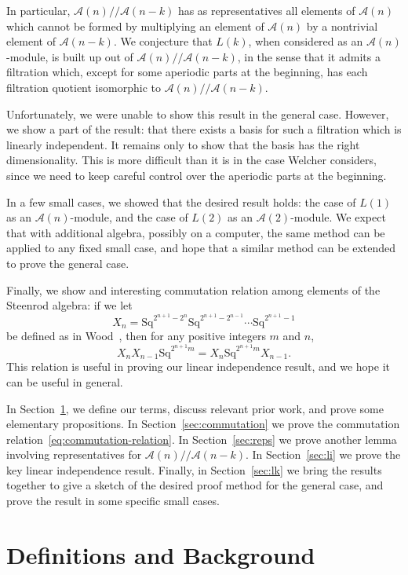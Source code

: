 \documentclass{article}
\newcommand{\A}{\mathcal{A}}
\newcommand{\Sq}{\mathrm{Sq}}
\newcommand{\mmod}{/\!/\!}
\begin{document}
In particular, $\A(n)\mmod\A(n-k)$ has as representatives all elements of $\A(n)$ which cannot be formed by multiplying an element of $\A(n)$ by a nontrivial element of $\A(n-k)$.  We conjecture that $L(k)$, when considered as an $\A(n)$-module, is built up out of $\A(n)\mmod\A(n-k)$, in the sense that it admits a filtration which, except for some aperiodic parts at the beginning, has each filtration quotient isomorphic to $\A(n)\mmod\A(n-k)$.

Unfortunately, we were unable to show this result in the general case.  However, we show a part of the result: that there exists a basis for such a filtration which is linearly independent.  It remains only to show that the basis has the right dimensionality.  This is more difficult than it is in the case Welcher considers, since we need to keep careful control over the aperiodic parts at the beginning.

In a few small cases, we showed that the desired result holds: the case of $L(1)$ as an $\A(n)$-module, and the case of $L(2)$ as an $\A(2)$-module.  We expect that with additional algebra, possibly on a computer, the same method can be applied to any fixed small case, and hope that a similar method can be extended to prove the general case.

Finally, we show and interesting commutation relation among elements of the Steenrod algebra: if we let
\[ X_n = \Sq^{2^{n+1}-2^n}\Sq^{2^{n+1}-2^{n-1}}\cdots\Sq^{2^{n+1}-1} \]
be defined as in Wood~\cite{wood}, then for any positive integers $m$ and $n$, 
\begin{equation}X_nX_{n-1}\Sq^{2^{n+1}m} = X_n\Sq^{2^{n+1}m}X_{n-1}.\label{eq:commutation-relation}\end{equation}
This relation is useful in proving our linear independence result, and we hope it can be useful in general.

In Section~\ref{sec:defns}, we define our terms, discuss relevant prior work, and prove some elementary propositions.  In Section~\ref{sec:commutation} we prove the commutation relation~\ref{eq:commutation-relation}.  In Section~\ref{sec:reps} we prove another lemma involving representatives for $\A(n)\mmod\A(n-k)$.  In Section~\ref{sec:li} we prove the key linear independence result.  Finally, in Section~\ref{sec:lk} we bring the results together to give a sketch of the desired proof method for the general case, and prove the result in some specific small cases.

\section{Definitions and Background}\label{sec:defns}
\end{document}
